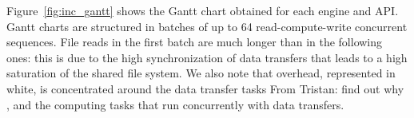 \documentclass[conference]{IEEEtran}
\newcommand{\TG}[1]{\color{cyan}From Tristan: #1 \color{black}}
\begin{document}
Figure~\ref{fig:inc_gantt} shows the Gantt chart obtained for each engine and API.
Gantt charts are structured in batches of up to 64 read-compute-write concurrent
sequences. File reads in the first batch are much longer than in the following ones:
this is due to the high synchronization of data transfers that leads to a high
saturation of the shared file system. We also note that overhead, represented in
white, is concentrated around the data transfer tasks \TG{find out why}, and the
computing tasks that run concurrently with data transfers. 
\end{document}
